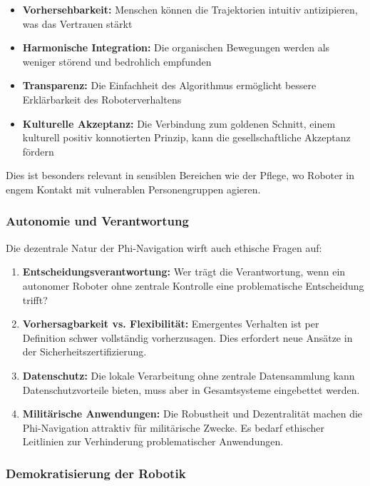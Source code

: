 ﻿\documentclass[a4paper,12pt]{article}
\theoremstyle{definition}
\begin{document}
\begin{itemize}
	\item \textbf{Vorhersehbarkeit:} Menschen können die Trajektorien intuitiv antizipieren, was das Vertrauen stärkt
	\item \textbf{Harmonische Integration:} Die organischen Bewegungen werden als weniger störend und bedrohlich empfunden
	\item \textbf{Transparenz:} Die Einfachheit des Algorithmus ermöglicht bessere Erklärbarkeit des Roboterverhaltens
	\item \textbf{Kulturelle Akzeptanz:} Die Verbindung zum goldenen Schnitt, einem kulturell positiv konnotierten Prinzip, kann die gesellschaftliche Akzeptanz fördern
\end{itemize}

Dies ist besonders relevant in sensiblen Bereichen wie der Pflege, wo Roboter in engem Kontakt mit vulnerablen Personengruppen agieren.

\subsubsection{Autonomie und Verantwortung}

Die dezentrale Natur der Phi-Navigation wirft auch ethische Fragen auf:

\begin{enumerate}
	\item \textbf{Entscheidungsverantwortung:} Wer trägt die Verantwortung, wenn ein autonomer Roboter ohne zentrale Kontrolle eine problematische Entscheidung trifft?
	
	\item \textbf{Vorhersagbarkeit vs. Flexibilität:} Emergentes Verhalten ist per Definition schwer vollständig vorherzusagen. Dies erfordert neue Ansätze in der Sicherheitszertifizierung.
	
	\item \textbf{Datenschutz:} Die lokale Verarbeitung ohne zentrale Datensammlung kann Datenschutzvorteile bieten, muss aber in Gesamtsysteme eingebettet werden.
	
	\item \textbf{Militärische Anwendungen:} Die Robustheit und Dezentralität machen die Phi-Navigation attraktiv für militärische Zwecke. Es bedarf ethischer Leitlinien zur Verhinderung problematischer Anwendungen.
\end{enumerate}

\subsubsection{Demokratisierung der Robotik}
\end{document}
